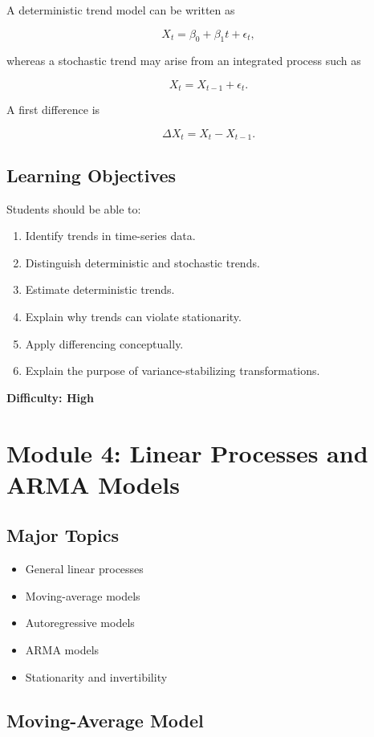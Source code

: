 \documentclass[11pt]{article}
\begin{document}
A deterministic trend model can be written as

\[
X_t = \beta_0 + \beta_1 t + \epsilon_t,
\]

whereas a stochastic trend may arise from an integrated process such as

\[
X_t = X_{t-1} + \epsilon_t.
\]

A first difference is

\[
\Delta X_t
=
X_t-X_{t-1}.
\]

\subsection{Learning Objectives}

Students should be able to:

\begin{enumerate}
    \item Identify trends in time-series data.
    \item Distinguish deterministic and stochastic trends.
    \item Estimate deterministic trends.
    \item Explain why trends can violate stationarity.
    \item Apply differencing conceptually.
    \item Explain the purpose of variance-stabilizing transformations.
\end{enumerate}

\textbf{Difficulty: High}

\section{Module 4: Linear Processes and ARMA Models}

\subsection{Major Topics}

\begin{itemize}
    \item General linear processes
    \item Moving-average models
    \item Autoregressive models
    \item ARMA models
    \item Stationarity and invertibility
\end{itemize}

\subsection{Moving-Average Model}
\end{document}
